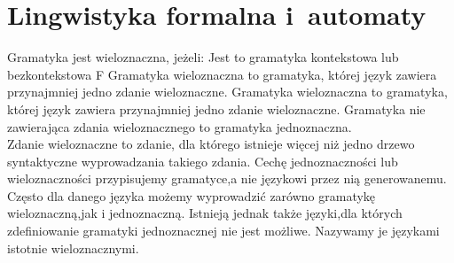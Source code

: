 \chapter{Lingwistyka formalna i~automaty}
\PartialToc

\answer
{Gramatyka jest wieloznaczna, jeżeli:}
{Jest to gramatyka kontekstowa lub bezkontekstowa}
{F}
{Gramatyka wieloznaczna to gramatyka, której język zawiera przynajmniej jedno zdanie wieloznaczne.}
{Gramatyka wieloznaczna to gramatyka, której język zawiera przynajmniej jedno zdanie wieloznaczne. Gramatyka nie zawierająca  zdania wieloznacznego to gramatyka jednoznaczna. \\
Zdanie wieloznaczne to zdanie, dla którego  istnieje więcej niż jedno drzewo syntaktyczne wyprowadzania takiego zdania. Cechę jednoznaczności lub wieloznaczności przypisujemy gramatyce,a nie językowi przez nią generowanemu. Często dla danego języka możemy wyprowadzić zarówno gramatykę wieloznaczną,jak i jednoznaczną. Istnieją jednak także języki,dla których zdefiniowanie gramatyki jednoznacznej nie jest możliwe. Nazywamy je językami istotnie wieloznacznymi.
}

